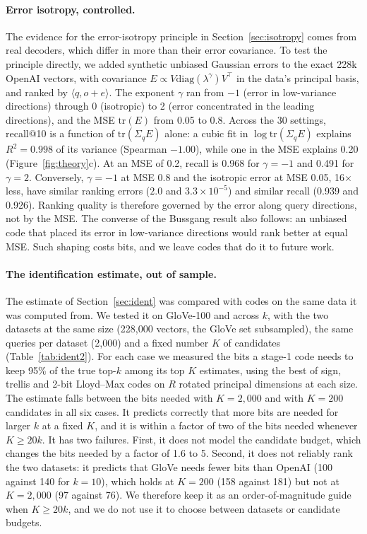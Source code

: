 \documentclass[10pt]{article}
\begin{document}
\paragraph{Error isotropy, controlled.} The evidence for the error-isotropy principle in Section~\ref{sec:isotropy} comes from real decoders, which differ in more than their error covariance. To test the principle directly, we added synthetic unbiased Gaussian errors to the exact 228k OpenAI vectors, with covariance $E\propto V\mathrm{diag}(\lambda^\gamma)V^\top$ in the data's principal basis, and ranked by $\langle q,o+e\rangle$. The exponent $\gamma$ ran from $-1$ (error in low-variance directions) through 0 (isotropic) to 2 (error concentrated in the leading directions), and the MSE $\mathrm{tr}(E)$ from 0.05 to 0.8. Across the 30 settings, recall@10 is a function of $\mathrm{tr}(\Sigma_qE)$ alone: a cubic fit in $\log\mathrm{tr}(\Sigma_qE)$ explains $R^2=0.998$ of its variance (Spearman $-1.00$), while one in the MSE explains 0.20 (Figure~\ref{fig:theory}c). At an MSE of 0.2, recall is 0.968 for $\gamma=-1$ and 0.491 for $\gamma=2$. Conversely, $\gamma=-1$ at MSE 0.8 and the isotropic error at MSE 0.05, 16$\times$ less, have similar ranking errors ($2.0$ and $3.3\times10^{-5}$) and similar recall (0.939 and 0.926). Ranking quality is therefore governed by the error along query directions, not by the MSE. The converse of the Bussgang result also follows: an unbiased code that placed its error in low-variance directions would rank better at equal MSE. Such shaping costs bits, and we leave codes that do it to future work.

\paragraph{The identification estimate, out of sample.} The estimate of Section~\ref{sec:ident} was compared with codes on the same data it was computed from. We tested it on GloVe-100 and across $k$, with the two datasets at the same size (228{,}000 vectors, the GloVe set subsampled), the same queries per dataset (2{,}000) and a fixed number $K$ of candidates (Table~\ref{tab:ident2}). For each case we measured the bits a stage-1 code needs to keep 95\% of the true top-$k$ among its top $K$ estimates, using the best of sign, trellis and 2-bit Lloyd--Max codes on $R$ rotated principal dimensions at each size. The estimate falls between the bits needed with $K=2{,}000$ and with $K=200$ candidates in all six cases. It predicts correctly that more bits are needed for larger $k$ at a fixed $K$, and it is within a factor of two of the bits needed whenever $K\ge20k$. It has two failures. First, it does not model the candidate budget, which changes the bits needed by a factor of 1.6 to 5. Second, it does not reliably rank the two datasets: it predicts that GloVe needs fewer bits than OpenAI (100 against 140 for $k=10$), which holds at $K=200$ (158 against 181) but not at $K=2{,}000$ (97 against 76). We therefore keep it as an order-of-magnitude guide when $K\ge20k$, and we do not use it to choose between datasets or candidate budgets.
\end{document}
